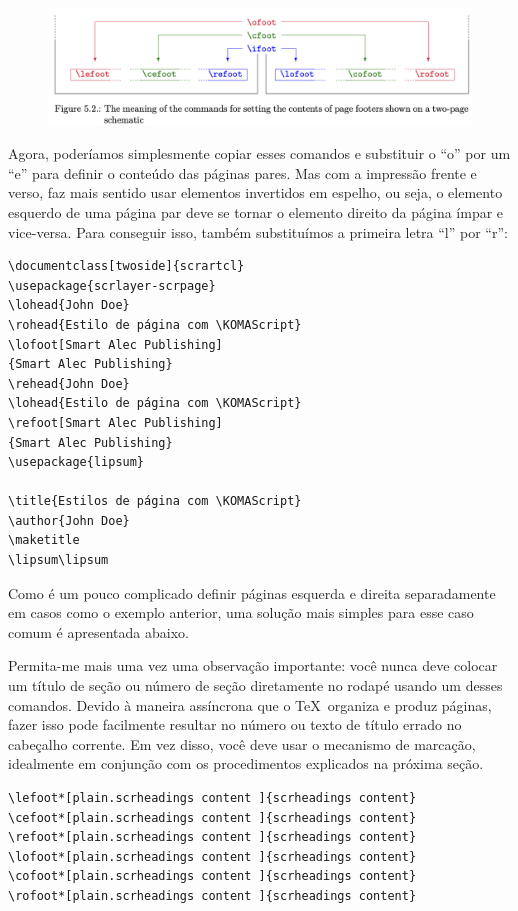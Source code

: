 \begin{figure}[h]
    \centering
    \includegraphics[width=1\linewidth]{imagens/imagem06.png}
\end{figure}

Agora, poderíamos simplesmente copiar esses comandos e substituir o “o” por um “e” para definir o conteúdo das páginas pares. Mas com a impressão frente e verso, faz mais sentido usar elementos invertidos em espelho, ou seja, o elemento esquerdo de uma página par deve se tornar o elemento direito da página ímpar e vice-versa. Para conseguir isso, também substituímos a primeira letra “l” por “r”:
\begin{verbatim}
\documentclass[twoside]{scrartcl}
\usepackage{scrlayer-scrpage}
\lohead{John Doe}
\rohead{Estilo de página com \KOMAScript}
\lofoot[Smart Alec Publishing]
{Smart Alec Publishing}
\rehead{John Doe}
\lohead{Estilo de página com \KOMAScript}
\refoot[Smart Alec Publishing]
{Smart Alec Publishing}
\usepackage{lipsum}

\title{Estilos de página com \KOMAScript}
\author{John Doe}
\maketitle
\lipsum\lipsum

\end{verbatim}

Como é um pouco complicado definir páginas esquerda e direita separadamente em casos como o exemplo anterior, uma solução mais simples para esse caso comum é apresentada abaixo.

Permita-me mais uma vez uma observação importante: você nunca deve colocar um título de seção ou número de seção diretamente no rodapé usando um desses comandos. Devido à maneira assíncrona que o \TeX\ organiza e produz páginas, fazer isso pode facilmente resultar no número ou texto de título errado no cabeçalho corrente. Em vez disso, você deve usar o mecanismo de marcação, idealmente em conjunção com os procedimentos explicados na próxima seção.
\begin{verbatim}
\lefoot*[plain.scrheadings content ]{scrheadings content}
\cefoot*[plain.scrheadings content ]{scrheadings content}
\refoot*[plain.scrheadings content ]{scrheadings content}
\lofoot*[plain.scrheadings content ]{scrheadings content}
\cofoot*[plain.scrheadings content ]{scrheadings content}
\rofoot*[plain.scrheadings content ]{scrheadings content}  
\end{verbatim}

